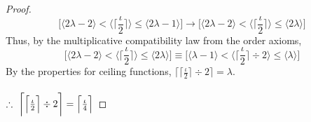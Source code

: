 \documentclass[preview]{standalone}
\begin{document}
\begin{proof}
\begin{equation*}
        \bigg[
            \Big \langle 2 \lambda - 2 \Big \rangle
                < 
            \Big \langle \Big \lceil \frac{\iota}{2} \Big \rceil \Big \rangle
                \le 
            \Big \langle 2 \lambda - 1\Big \rangle
        \bigg]
            \rightarrow
        \bigg[
            \Big \langle 2 \lambda - 2 \Big \rangle
                < 
            \Big \langle \Big \lceil \frac{\iota}{2} \Big \rceil \Big \rangle
                \le 
            \Big \langle 2 \lambda \Big \rangle
        \bigg]
    \end{equation*}
    Thus, by the multiplicative compatibility law from the order axioms,
    \begin{equation*}
        \bigg[
            \Big \langle 2 \lambda - 2 \Big \rangle
                < 
            \Big \langle \Big \lceil \frac{\iota}{2} \Big \rceil \Big \rangle
                \le 
            \Big \langle 2 \lambda \Big \rangle
        \bigg]
            \equiv
        \bigg[
            \Big \langle \lambda - 1 \Big \rangle
                < 
            \Big \langle \Big \lceil \frac{\iota}{2} \Big \rceil \div 2 \Big \rangle
                \le 
            \Big \langle \lambda \Big \rangle
        \bigg]
    \end{equation*}
    By the properties for ceiling functions, 
    $\big \lceil \big \lceil \frac{\iota}{2} \big \rceil \div 2 \big \rceil = \lambda$.
    \\ \\
    $\therefore \text{\space} \relax{
        \bigg \lceil \Big \lceil \frac{\iota}{2} \Big \rceil \div 2 \bigg \rceil 
            = 
        \Big \lceil \frac{\iota}{4} \Big \rceil
    }$
\end{proof}
\end{document}

